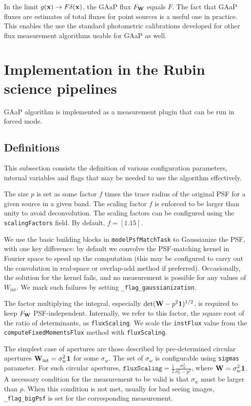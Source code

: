 \documentclass[DM,lsstdraft, authoryear,toc]{lsstdoc}
\begin{document}
In the limit $g({\bf x}) \rightarrow F\delta({\bf x})$, the GAaP flux $F_{\bf W}$ equals $F$.
The fact that GAaP fluxes are estimates of total fluxes for point sources is a useful one in practice.
This enables the use the standard photometric calibrations developed for other flux measurement algorithms usable for GAaP as well.

\section{Implementation in the Rubin science pipelines}
GAaP algorithm is implemented as a measurement plugin that can be run in forced mode.

\subsection{Definitions}
This subsection consists the definition of various configuration parameters, internal variables and flags that may be needed to use the algorithm effectively.

The size $p$ is set as some factor $f$ times the trace radius of the original PSF for a given source in a given band.
The scaling factor $f$ is enforced to be larger than unity to avoid deconvolution.
The scaling factors can be configured using the \texttt{scalingFactors} field.
By default, $f=[1.15]$.

We use the basic building blocks in \texttt{modelPsfMatchTask} to Gaussianize the PSF, with one key difference:
by default we convolve the PSF-matching kernel in Fourier space to speed up the computation (this may be configured to carry out the convolution in real-space or overlap-add method if preferred).
Occasionally, the solution for the kernel fails, and no measurement is possible for any values of $W_\text{int}$.
We mark such failures by setting \texttt{\_flag\_gaussianization}.

The factor multiplying the integral, especially $\det({\bf W}-p^2{\bf 1})^{1/2}$, is required to keep $F_{\bf W}$ PSF-independent.
Internally, we refer to this factor, the square root of the ratio of determinants, as \texttt{fluxScaling}.
We scale the \texttt{instFlux} value from the \texttt{computeFixedMomentsFlux} method with \texttt{fluxScaling}.

The simplest case of apertures are those described by pre-determined circular apertures ${\bf W}_\text{int} = \sigma_w^2\mathbf{1}$ for some $\sigma_w$.
The set of $\sigma_w$ is configurable using \texttt{sigmas} parameter.
For such circular apertures, $\texttt{fluxScaling} = \frac{1}{2}\frac{\sigma_w^2}{\sigma_w^2-p^2}$,
where ${\bf W} = \sigma_w^2 \bf{1}$.
A necessary condition for the measurement to be valid is that $\sigma_w$ must be larger than $p$.
When this condition is not met, usually for bad seeing images, \texttt{\_flag\_bigPsf} is set for the corresponding measurement.
\end{document}
